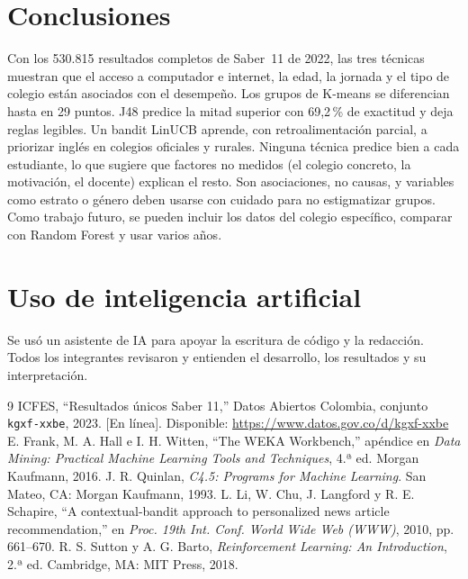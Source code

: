 \documentclass[conference]{IEEEtran}
\begin{document}
\section{Conclusiones}
Con los 530.815 resultados completos de Saber~11 de 2022, las tres técnicas muestran que el acceso a computador e internet, la edad, la jornada y el tipo de colegio están asociados con el desempeño. Los grupos de K-means se diferencian hasta en 29 puntos. J48 predice la mitad superior con 69,2\,\% de exactitud y deja reglas legibles. Un bandit LinUCB aprende, con retroalimentación parcial, a priorizar inglés en colegios oficiales y rurales. Ninguna técnica predice bien a cada estudiante, lo que sugiere que factores no medidos (el colegio concreto, la motivación, el docente) explican el resto. Son asociaciones, no causas, y variables como estrato o género deben usarse con cuidado para no estigmatizar grupos. Como trabajo futuro, se pueden incluir los datos del colegio específico, comparar con Random Forest y usar varios años.

\section*{Uso de inteligencia artificial}
Se usó un asistente de IA para apoyar la escritura de código y la redacción. Todos los integrantes revisaron y entienden el desarrollo, los resultados y su interpretación.

\begin{thebibliography}{9}
 ICFES, ``Resultados únicos Saber 11,'' Datos Abiertos Colombia, conjunto \texttt{kgxf-xxbe}, 2023. [En línea]. Disponible: \url{https://www.datos.gov.co/d/kgxf-xxbe}
 E. Frank, M. A. Hall e I. H. Witten, ``The WEKA Workbench,'' apéndice en \emph{Data Mining: Practical Machine Learning Tools and Techniques}, 4.ª ed. Morgan Kaufmann, 2016.
 J. R. Quinlan, \emph{C4.5: Programs for Machine Learning}. San Mateo, CA: Morgan Kaufmann, 1993.
 L. Li, W. Chu, J. Langford y R. E. Schapire, ``A contextual-bandit approach to personalized news article recommendation,'' en \emph{Proc. 19th Int. Conf. World Wide Web (WWW)}, 2010, pp. 661--670.
 R. S. Sutton y A. G. Barto, \emph{Reinforcement Learning: An Introduction}, 2.ª ed. Cambridge, MA: MIT Press, 2018.
\end{thebibliography}
\end{document}
